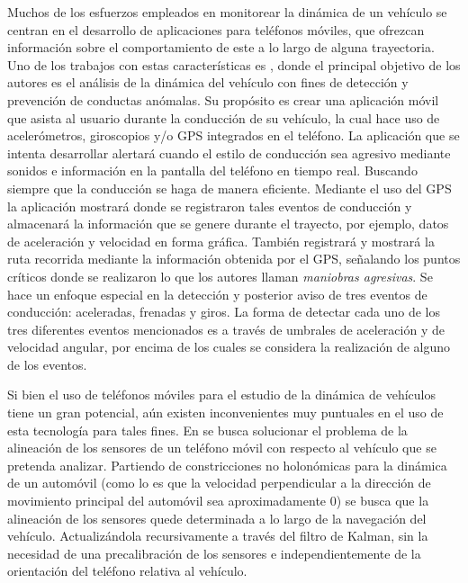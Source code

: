 Muchos de los esfuerzos empleados en monitorear la dinámica de un vehículo se centran en el desarrollo de aplicaciones para teléfonos móviles, que ofrezcan información sobre el comportamiento de este a lo largo de alguna trayectoria. 
Uno de los trabajos con estas características es \cite{Valladolid}, donde el principal objetivo de los autores es el análisis de la dinámica del vehículo con fines de detección y prevención de conductas anómalas. 
Su propósito es crear una aplicación móvil que asista al usuario durante la conducción de su vehículo, la cual hace uso de acelerómetros, giroscopios y/o GPS integrados en el teléfono. 
La aplicación que se intenta desarrollar alertará cuando el estilo de conducción sea agresivo mediante sonidos e información en la pantalla del teléfono en tiempo real. 
Buscando siempre que la conducción se haga de manera eficiente.
Mediante el uso del GPS la aplicación mostrará donde se registraron tales eventos de conducción y almacenará la información que se genere durante el trayecto, por ejemplo, datos de aceleración y velocidad en forma gráfica. 
También registrará y mostrará la ruta recorrida mediante la información obtenida por el GPS, señalando los puntos críticos donde se realizaron lo que los autores llaman {\em maniobras agresivas}. 
Se hace un enfoque especial en la detección y posterior aviso de tres eventos de conducción: aceleradas, frenadas y giros. 
La forma de detectar cada uno de los tres diferentes eventos mencionados es a través de umbrales de aceleración y de velocidad angular, por encima de los cuales se considera la realización de alguno de los eventos.

Si bien el uso de teléfonos móviles para el estudio de la dinámica de vehículos tiene un gran potencial, aún existen inconvenientes muy puntuales en el uso de esta tecnología para tales fines.
En \cite{7266726} se busca solucionar el problema de la alineación de los sensores de un teléfono móvil con respecto al vehículo que se pretenda analizar. 
Partiendo de constricciones no holonómicas para la dinámica de un automóvil (como lo es que la velocidad perpendicular a la dirección de movimiento principal del automóvil sea aproximadamente $0$) se busca que la alineación de los sensores quede determinada a lo largo de la navegación del vehículo. 
Actualizándola recursivamente a través del filtro de Kalman, sin la necesidad de una precalibración de los sensores e independientemente de la orientación del teléfono relativa al vehículo.

